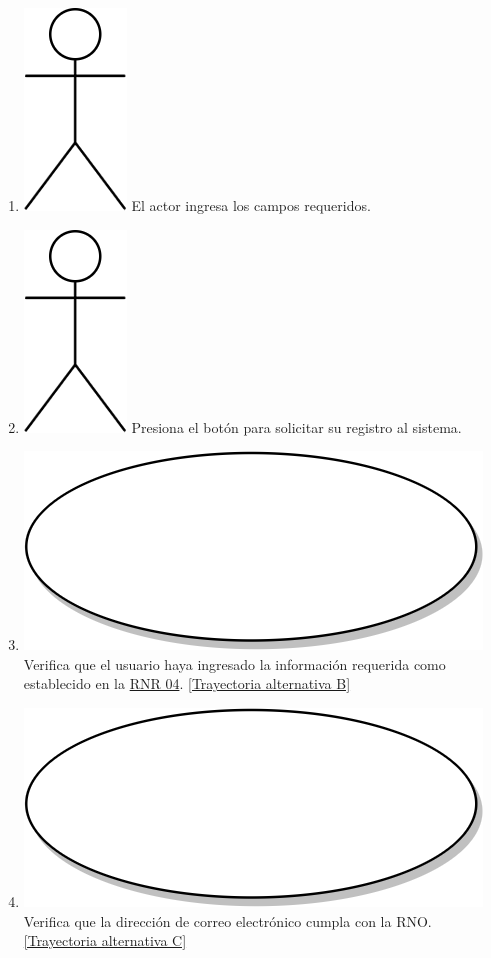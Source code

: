\begin{enumerate}
  \item {\includegraphics[scale=.1]{Capitulo3/img/actor.png} El actor ingresa los campos requeridos.}
  \item {\includegraphics[scale=.1]{Capitulo3/img/actor.png} Presiona el botón para solicitar su registro al sistema.}
  \item {\includegraphics[scale=.05]{Capitulo3/img/proceso.png} Verifica que el usuario haya ingresado la información requerida como establecido en la \hyperref[rnr_04]{RNR 04}. \hyperref[cu2_ta_b]{[Trayectoria alternativa B]}}
  \item {\includegraphics[scale=.05]{Capitulo3/img/proceso.png} Verifica que la dirección de correo electrónico cumpla con la RNO. \hyperref[cu2_ta_c]{[Trayectoria alternativa C]}}

\end{enumerate}
